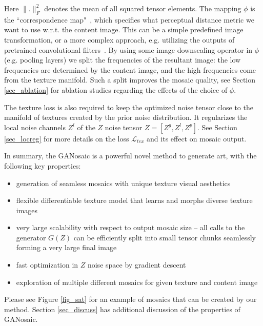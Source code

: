 \documentclass{article}
\begin{document}
Here  $\| . \|_F^2$ denotes the mean of all squared tensor elements. %
The mapping $\phi$ is the ``correspondence map"~\cite{EfrosQ}, which specifies what perceptual distance metric we want to use w.r.t. the content image. This can be a simple predefined image transformation, or a more complex approach, e.g. utilizing the outputs of pretrained convolutional filters~\cite{GatysEB15a}.
By using some image downscaling operator in $\phi$ (e.g. pooling layers) we split the frequencies of the resultant image: the low frequencies are determined by the content image, and the high frequencies come from the texture manifold. Such a split improves the mosaic quality, 
see Section \ref{sec_ablation} for ablation studies regarding the effects of the choice of $\phi$. 

The texture loss is also required to keep the optimized noise tensor close to the manifold of textures created by the prior noise distribution. It regularizes the local noise channels $Z^l$ of the $Z$ noise tensor $Z = [Z^g,Z^l,Z^p]$. See Section \ref{sec_locreg} for more details on the loss $\mathcal{L}_{tex}$ and its effect on mosaic output. 

In summary, the GANosaic is a powerful novel method to generate art, with the following key properties:
\begin{itemize}
\item generation of seamless mosaics with unique texture visual aesthetics %
\item flexible differentiable texture model \citep{PSGAN2017} that learns and morphs diverse texture images 
\item very large scalability with respect to output mosaic size -- all calls to the generator $G(Z)$ can be efficiently split into small tensor chunks seamlessly forming a very large final image \citep{SGAN2016}
\item fast optimization in $Z$ noise space by gradient descent
\item exploration of multiple different mosaics for given texture and content image
\end{itemize}
Please see Figure \ref{fig_sat} for an example of mosaics that can be created by our method. Section \ref{sec_discuss} has additional discussion of the properties of GANosaic.
\end{document}
